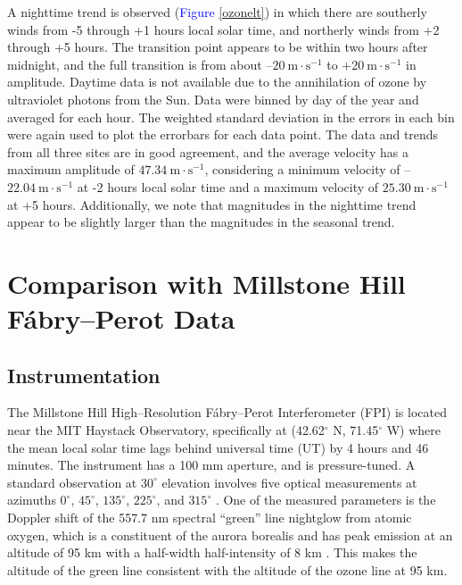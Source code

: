 \documentclass[11pt]{article}
\begin{document}
A nighttime trend is observed (\textcolor{blue}{Figure} \ref{ozonelt}) in which there are southerly winds from -5 through +1 hours local solar time, and northerly winds from +2 through +5 hours. The transition point appears to be within two hours after midnight, and the full transition is from about --$20~\text{m}\cdot\text{s}^{-1}$ to $+20~ \text{m}\cdot\text{s}^{-1}$ in amplitude. Daytime data is not available due to the annihilation of ozone by ultraviolet photons from the Sun. Data were binned by day of the year and averaged for each hour. The weighted standard deviation in the errors in each bin were again used to plot the errorbars for each data point. The data and trends from all three sites are in good agreement, and the average velocity has a maximum amplitude of $47.34~\text{m}\cdot\text{s}^{-1}$, considering a minimum velocity of --$22.04~\text{m}\cdot\text{s}^{-1}$ at -2 hours local solar time and a maximum velocity of $25.30~\text{m}\cdot\text{s}^{-1}$ at +5 hours. Additionally, we note that magnitudes in the nighttime trend appear to be slightly larger than the magnitudes in the seasonal trend.
\section{Comparison with Millstone Hill F\'abry--Perot Data}\label{SEC4}
\subsection{Instrumentation}
The Millstone Hill High--Resolution F\'abry--Perot Interferometer (FPI) is located near the MIT Haystack Observatory, specifically at (42.62$^\circ$ N, 71.45$^\circ$ W) where the mean local solar time lags behind universal time (UT) by 4 hours and 46 minutes. The instrument has a 100 mm aperture, and is pressure-tuned. A standard observation at $30^\circ$ elevation involves five optical measurements at azimuths $0^\circ$, $45^\circ$, $135^\circ$, $225^\circ$, and $315^\circ$ \cite{fpi}. One of the measured parameters is the Doppler shift of the 557.7 nm spectral ``green'' line nightglow from atomic oxygen, which is a constituent of the aurora borealis \cite{McLennan1927} and has peak emission at an altitude of 95 km with a half-width half-intensity of 8 km \cite{Gao2012}\cite{Phillips1994}. This makes the altitude of the green line consistent with the altitude of the ozone line at 95 km.
\end{document}
